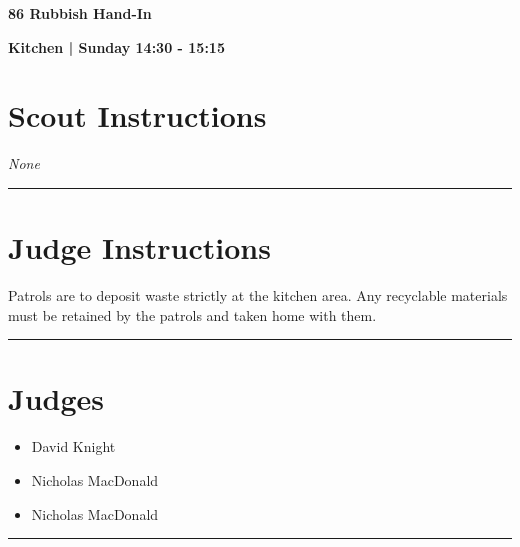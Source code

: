 \documentclass[10pt]{article}
\newcommand{\newtitle}[1]{\begin{center}{\Huge\bfseries #1 }\\ \vspace{5mm}\end{center}}
\newcommand{\newsubtitle}[1]{\begin{center}{\color{grey}\Large\bfseries #1 }\\ \vspace{5mm}\end{center}}
\begin{document}
	\vspace{1cm}


	\clearpage
		\newtitle{86 Rubbish Hand-In }
	\newsubtitle{Kitchen | Sunday 14:30 - 15:15}
		\setcounter{section}{85}
	\section*{Scout Instructions}
		\textit{None}
	
	\vspace{0.5cm}
	\hrule
	\vspace{0.5cm}

		\section*{Judge Instructions}
		Patrols are to deposit waste strictly at the kitchen area. Any recyclable materials must be retained by the patrols and taken home with them.
\vspace{0.5cm}
	\hrule
	\vspace{0.5cm}
		\section*{\faUsers \: Judges}

		

	\begin{multicols}{2}

		\begin{itemize}
									\item David Knight
									\item Nicholas MacDonald
						\end{itemize}

		\vfill\null
		\columnbreak

		\begin{itemize}
									\item Nicholas MacDonald
						\end{itemize}

		\vfill\null

		\end{multicols}



			\vspace{0.5cm}
	\hrule
	\vspace{0.5cm}
\end{document}
